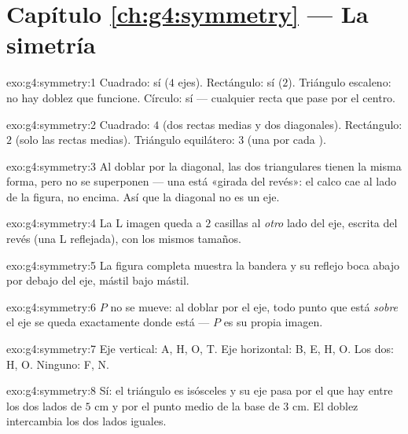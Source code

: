 \section*{Capítulo \ref{ch:g4:symmetry} --- La simetría}

\begin{solution}{exo:g4:symmetry:1}
Cuadrado: sí ($4$ ejes). Rectángulo: sí ($2$). Triángulo escaleno: no hay
doblez que funcione. Círculo: sí --- cualquier recta que pase por el centro.
\end{solution}

\begin{solution}{exo:g4:symmetry:2}
Cuadrado: $4$ (dos rectas medias y dos diagonales). Rectángulo: $2$ (solo las
rectas medias). Triángulo equilátero: $3$ (una por cada
).
\end{solution}

\begin{solution}{exo:g4:symmetry:3}
Al doblar por la diagonal, las dos  triangulares tienen la misma
forma, pero no se superponen --- una está «girada del
revés»: el calco cae al lado de la figura, no encima. Así que la
diagonal no es un eje.
\end{solution}

\begin{solution}{exo:g4:symmetry:4}
La L imagen queda a $2$ casillas al \emph{otro} lado del eje,
escrita del revés (una L reflejada), con los mismos tamaños.
\end{solution}

\begin{solution}{exo:g4:symmetry:5}
La figura completa muestra la bandera y su reflejo boca abajo
por debajo del eje, mástil bajo mástil.
\end{solution}

\begin{solution}{exo:g4:symmetry:6}
$P$ no se mueve: al doblar por el eje, todo punto que está
\emph{sobre} el eje se queda exactamente donde está --- $P$ es su propia imagen.
\end{solution}

\begin{solution}{exo:g4:symmetry:7}
Eje vertical: A, H, O, T. Eje horizontal: B, E, H, O. Los dos: H, O.
Ninguno: F, N.
\end{solution}

\begin{solution}{exo:g4:symmetry:8}
Sí: el triángulo es isósceles y su eje pasa por el 
que hay entre los dos lados de $5$ cm y por el punto medio de la base de $3$ cm. El
doblez intercambia los dos lados iguales.
\end{solution}

